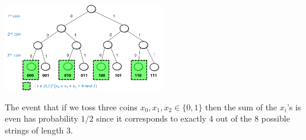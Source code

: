 \begin{marginfigure}
\centering
\includegraphics[width=\linewidth, height=1.5in, keepaspectratio]{../figure/even3coins.png}
\caption{The event that if we toss three coins
\(x_0,x_1,x_2 \in \{0,1\}\) then the sum of the \(x_i\)'s is even has
probability \(1/2\) since it corresponds to exactly \(4\) out of the
\(8\) possible strings of length \(3\).}
\label{eventhreecoinsfig}
\end{marginfigure}

\hypertarget{evenprob}{}


